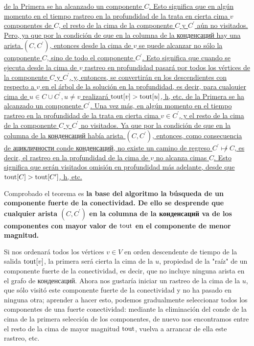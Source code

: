 \ul{
\li de la Primera se ha alcanzado un componente $C$. Esto significa que en algún momento en el tiempo rastreo en la profundidad de la trata en cierta cima $v$ componentes de $C$, el resto de la cima de la componente $C$ y $C^\prime$ aún no visitados. Pero, ya que por la condición de que en la columna de la конденсаций hay una arista $(C,C^\prime)$, entonces desde la cima de $v$ se puede alcanzar no sólo la componente $C$, sino de todo el componente $C^\prime$. Esto significa que cuando se ejecuta desde la cima de $v$ rastreo en profundidad pasará por todos los vértices de la componente $C$ y $C^\prime$, y, entonces, se convertirán en los descendientes con respecto a $v$ en el árbol de la solución en la profundidad, es decir, para cualquier cima de $u \in C \cup C^\prime, u \ne v$ realizará ${\rm tout}[v] > {\rm tout}[u]$, h, etc.
\li de la Primera se ha alcanzado un componente $C^\prime$. Una vez más, en algún momento en el tiempo rastreo en la profundidad de la trata en cierta cima $v \in C^\prime$, y el resto de la cima de la componente $C$ y $C^\prime$ no visitados. Ya que por la condición de que en la columna de la конденсаций había arista $(C,C^\prime)$, entonces, como consecuencia de ацикличности conde конденсаций, no existe un camino de regreso $C^\prime \not\mapsto C$, es decir, el rastreo en la profundidad de la cima de $v$ no alcanza cimas $C$. Esto significa que serán visitados omisión en profundidad más adelante, desde que ${\rm tout}[C] > {\rm tout}[C^\prime]$, h, etc.
}

Comprobado el teorema es \bf{la base del algoritmo} la búsqueda de un componente fuerte de la conectividad. De ello se desprende que cualquier arista $(C,C^\prime)$ en la columna de la конденсаций va de los componentes con mayor valor de ${\rm tout}$ en el componente de menor magnitud.

Si nos ordenará todos los vértices $v \in V$ en orden descendente de tiempo de la salida ${\rm tout}[v]$, la primera será cierta la cima de la $u$, propiedad de la "raíz" de un componente fuerte de la conectividad, es decir, que no incluye ninguna arista en el grafo de конденсаций. Ahora nos gustaría iniciar un rastreo de la cima de la $u$, que sólo visitó este componente fuerte de la conectividad y no ha pasado en ninguna otra; aprender a hacer esto, podemos gradualmente seleccionar todos los componentes de una fuerte conectividad: mediante la eliminación del conde de la cima de la primera selección de los componentes, de nuevo nos encontramos entre el resto de la cima de mayor magnitud ${\rm tout}$, vuelva a arrancar de ella este rastreo, etc.

